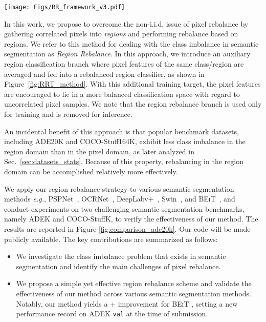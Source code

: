 \documentclass[final]{cvpr}
\begin{document}
\begin{figure*}[t]
	\begin{center}
		\texttt{[image: Figs/RR\_framework\_v3.pdf]}
		\caption{\textbf{Illustrating the region rebalance scheme for semantic segmentation:} The region rebalance branch is indicated by the tan-colored box. We introduce the region rebalance branch (w/o any other changes to the semantic segmentation network and pixel classifier) to handle the class imbalance problem during training and remove it during evaluation.}
		\label{fig:RRT_method}
	\end{center}
	\vspace{-0.00in}
\end{figure*}


In this work, we propose to overcome the non-i.i.d. issue of pixel rebalance by gathering correlated pixels into {\em regions} and performing rebalance based on regions. We refer to this method for dealing with the class imbalance in semantic segmentation as \emph{Region Rebalance}. In this approach, we introduce an auxiliary region classification branch where pixel features of the same class/region are averaged and fed into a rebalanced region classifier, as shown in Figure~\ref{fig:RRT_method}. With this additional training target, the pixel features are encouraged to lie in a more balanced classification space with regard to uncorrelated pixel samples. We note that the region rebalance branch is used only for training and is removed for inference.

An incidental benefit of this approach is that popular benchmark datasets, including ADE20K and COCO-Stuff164K, exhibit less class imbalance in the region domain than in the pixel domain, as later analyzed in Sec.~\ref{sec:datasets_stats}. Because of this property, rebalancing in the region domain can be accomplished relatively more effectively.


We apply our region rebalance strategy to
various semantic segmentation methods {\it e.g.}, PSPNet~\cite{DBLP:conf/cvpr/ZhaoSQWJ17}, OCRNet~\cite{yuan2020object}, DeepLabv+~\cite{chen2018encoder}, Swin~\cite{liu2021swin}, and \textsc{BEiT}~\cite{bao2021beit}, and conduct experiments on two challenging semantic segmentation benchmarks, namely ADEK\cite{zhou2017scene} and COCO-StuffK\cite{caesar2018coco},
to verify the effectiveness of our method.
The results are reported in
Figure \ref{fig:comparison_ade20k}.
Our code will be made publicly available.
The key contributions are summarized as follows:
\begin{itemize}
    \vspace{-0.1in}
	\item We investigate the class imbalance problem that exists in semantic segmentation and identify the main challenges of pixel rebalance.
	\vspace{-0.1in}
	\item We propose a simple yet effective region rebalance scheme and validate the effectiveness of our method across various semantic segmentation methods. Notably, our method yields a + improvement for \textsc{BEiT} \cite{bao2021beit}, setting a new performance record on ADEK \texttt{val} at the time of submission. 
\end{itemize}
\end{document}
